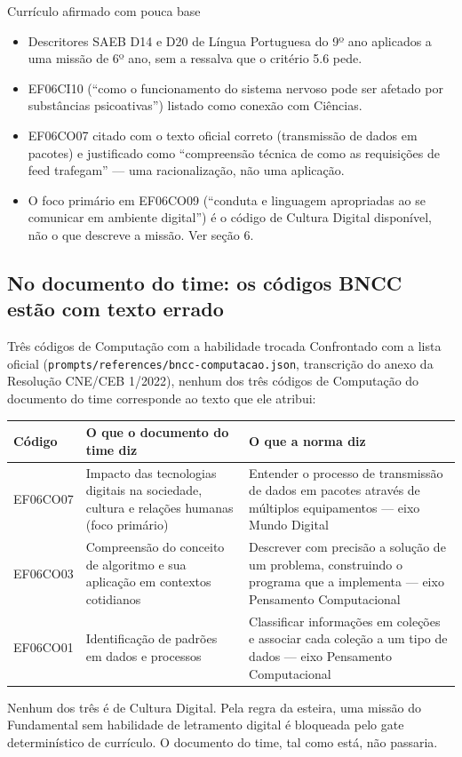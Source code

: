 \documentclass[11pt,a4paper]{article}
\newcommand{\arq}[1]{\texttt{\small #1}}
\begin{document}
\begin{achadobox}{Currículo afirmado com pouca base}
\begin{itemize}
\item Descritores SAEB D14 e D20 de Língua Portuguesa do 9º ano aplicados a uma missão de 6º ano, sem a ressalva que o critério 5.6 pede.
\item EF06CI10 (``como o funcionamento do sistema nervoso pode ser afetado por substâncias psicoativas'') listado como conexão com Ciências.
\item EF06CO07 citado com o texto oficial correto (transmissão de dados em pacotes) e justificado como ``compreensão técnica de como as requisições de feed trafegam'' --- uma racionalização, não uma aplicação.
\item O foco primário em EF06CO09 (``conduta e linguagem apropriadas ao se comunicar em ambiente digital'') é o código de Cultura Digital disponível, não o que descreve a missão. Ver seção 6.
\end{itemize}
\end{achadobox}

\subsection{No documento do time: os códigos BNCC estão com texto errado}

\begin{achadobox}{Três códigos de Computação com a habilidade trocada}
Confrontado com a lista oficial (\arq{prompts/references/bncc-computacao.json}, transcrição do anexo da Resolução CNE/CEB 1/2022), nenhum dos três códigos de Computação do documento do time corresponde ao texto que ele atribui:

\begin{center}
\small
\begin{tabularx}{\textwidth}{@{}l X X@{}}
\toprule
\textbf{Código} & \textbf{O que o documento do time diz} & \textbf{O que a norma diz} \\
\midrule
EF06CO07 & Impacto das tecnologias digitais na sociedade, cultura e relações humanas (foco primário) & Entender o processo de transmissão de dados em pacotes através de múltiplos equipamentos --- eixo Mundo Digital \\
EF06CO03 & Compreensão do conceito de algoritmo e sua aplicação em contextos cotidianos & Descrever com precisão a solução de um problema, construindo o programa que a implementa --- eixo Pensamento Computacional \\
EF06CO01 & Identificação de padrões em dados e processos & Classificar informações em coleções e associar cada coleção a um tipo de dados --- eixo Pensamento Computacional \\
\bottomrule
\end{tabularx}
\end{center}

Nenhum dos três é de Cultura Digital. Pela regra da esteira, uma missão do Fundamental sem habilidade de letramento digital é bloqueada pelo gate determinístico de currículo. O documento do time, tal como está, não passaria.
\end{achadobox}
\end{document}
